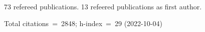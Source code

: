 73 refereed publications. 13 refeered publications as first author.

Total citations~=~2848; h-index~=~29 (2022-10-04)